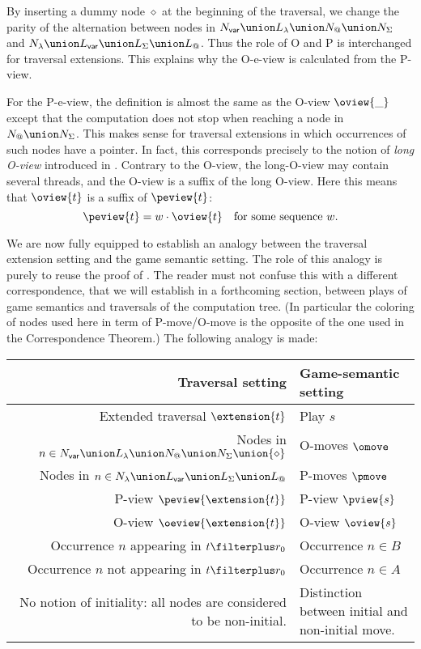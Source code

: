 By inserting a dummy node $\diamond$ at the beginning of the traversal, we
change the parity of the alternation between nodes in $N_{\sf
var} \union L_\lambda \union N_@ \union N_\Sigma$ and $N_\lambda
\union L_{\sf var} \union L_\Sigma \union L_@$.
Thus the role of O and P is interchanged for traversal extensions. This explains why the O-e-view is calculated from the P-view.

For the P-e-view, the definition is almost the same as the O-view $\oview{\_}$ except that the computation does not stop when reaching a node
in $N_@ \union N_\Sigma$. This makes sense for traversal extensions in which occurrences of such nodes have a pointer. In fact, this corresponds precisely to the notion of \emph{long O-view} introduced in \cite{Harmer2005}. Contrary to the O-view, the long-O-view may contain several threads, and the O-view is a suffix of the long O-view. Here this means that $\oview{t}$ is a suffix of $\peview{t}$:
\begin{equation}
  \peview{t} = w \cdot \oview{t} \quad \mbox{for some sequence $w$.} \label{eqn:oview_suffix_preview}
\end{equation}
\smallskip

We are now fully equipped to establish an analogy between the traversal extension setting and the game
semantic setting. The role of this analogy is purely to reuse the
proof of \cite{hylandong_pcf}. The reader must not confuse this with
a different correspondence, that we will establish in a forthcoming
section, between plays of game semantics and traversals of the
computation tree. (In particular the coloring of nodes used here in
term of P-move/O-move is the opposite of the one used in the
Correspondence Theorem.) The following analogy is made:
\begin{center}
\begin{tabular}{r|p{6cm}}
{\bf Traversal setting} & {\bf Game-semantic setting} \\
\hline\hline
Extended traversal $\extension{t}$ & Play $s$ \\
Nodes in $n \in N_{\sf var} \union L_\lambda \union N_@ \union N_\Sigma \union \{\diamond\}$ & O-moves $\omove$ \\
Nodes in $n \in N_\lambda \union L_{\sf var} \union L_\Sigma \union L_@$ & P-moves $\pmove$\\
P-view $\peview{\extension{t}}$  & P-view $\pview{s}$\\
O-view $\oeview{\extension{t}}$  & O-view $\oview{s}$\\
Occurrence $n$ appearing in $t\filterplus r_0$ & Occurrence $n \in B$ \\
Occurrence $n$ not appearing in $t\filterplus r_0$ & Occurrence $n \in A$ \\
\parbox[t]{6cm}{\raggedleft No notion of initiality: all nodes are considered to be non-initial.} & Distinction between initial and non-initial move.
\end{tabular}
\end{center}


